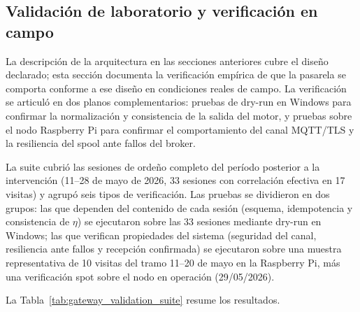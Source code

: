
\subsection{Validación de laboratorio y verificación en campo}
\label{subsec:validacion_gateway_campo}

La descripción de la arquitectura en las secciones anteriores cubre el diseño
declarado; esta sección documenta la verificación empírica de que la pasarela
se comporta conforme a ese diseño en condiciones reales de campo. La
verificación se articuló en dos planos complementarios: pruebas de dry-run
en Windows para confirmar la normalización y consistencia de la salida del
motor, y pruebas sobre el nodo Raspberry Pi para confirmar el comportamiento
del canal \ac{MQTT}/\ac{TLS} y la resiliencia del spool ante fallos del broker.

La suite cubrió las sesiones de ordeño completo del período posterior a la
intervención (11--28 de mayo de 2026, 33 sesiones con correlación efectiva en
17 visitas) y agrupó seis tipos de verificación. Las pruebas se dividieron en
dos grupos: las que dependen del contenido de cada sesión (esquema, idempotencia
y consistencia de $\eta$) se ejecutaron sobre las 33 sesiones mediante dry-run
en Windows; las que verifican propiedades del sistema (seguridad del canal,
resiliencia ante fallos y recepción confirmada) se ejecutaron sobre una muestra
representativa de 10 visitas del tramo 11--20 de mayo en la Raspberry Pi, más
una verificación spot sobre el nodo en operación (29/05/2026).

La Tabla~\ref{tab:gateway_validation_suite} resume los resultados.

